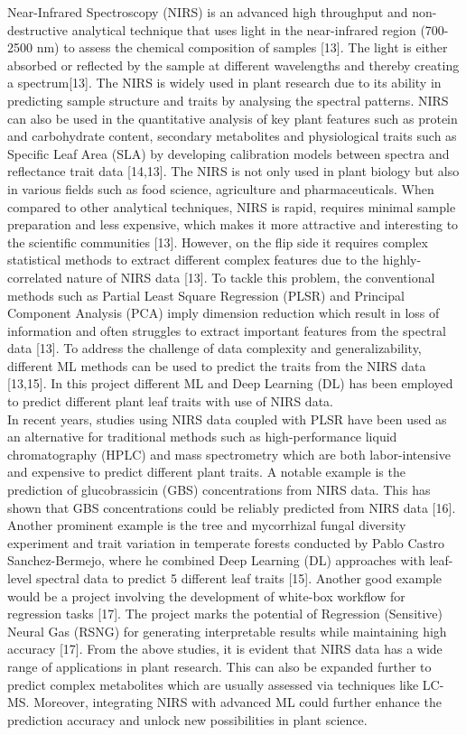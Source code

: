 \documentclass[12pt,a4paper]{article}
\begin{document}
Near-Infrared Spectroscopy (NIRS) is an advanced high throughput and non-destructive analytical technique that uses light in the near-infrared region (700-2500 nm) to assess the chemical composition of samples [13]. The light is either absorbed or reflected by the sample at different wavelengths and thereby creating a spectrum[13]. The NIRS is widely used in plant research due to its ability in predicting sample structure and traits by analysing the spectral patterns.
NIRS can also be used in the quantitative analysis of key plant features such as protein and carbohydrate content, secondary metabolites and physiological traits such as Specific Leaf Area (SLA) by developing calibration models between spectra and reflectance trait data [14,13]. The NIRS is not only used in plant biology but also in various fields such as food science, agriculture and pharmaceuticals. When compared to other analytical techniques, NIRS is rapid, 
requires minimal sample preparation and less expensive, which makes it more attractive and interesting to the scientific communities [13]. However, on the flip side it requires complex statistical methods to extract different complex features due to the highly-correlated nature of NIRS data [13]. To tackle this problem, the conventional methods such as Partial Least Square Regression (PLSR) and Principal Component Analysis (PCA) imply dimension reduction which 
result in loss of information and often struggles to extract important features from the spectral data [13]. To address the challenge of data complexity and generalizability, different ML methods can be used to predict the traits from the NIRS data [13,15]. In this project different ML and Deep Learning (DL) has been employed to predict different plant leaf traits with use of NIRS data. \\


In recent years, studies using NIRS data coupled with PLSR have been used as an alternative for traditional methods such as high-performance liquid chromatography (HPLC) and mass spectrometry which are both labor-intensive and expensive to predict different plant traits. A notable example is the prediction of glucobrassicin (GBS) concentrations from NIRS data. This has shown that GBS 
concentrations could be reliably predicted from NIRS data [16]. Another prominent example is the tree and mycorrhizal fungal diversity experiment and  trait variation in temperate forests  conducted by Pablo Castro Sanchez-Bermejo, where he combined Deep Learning (DL) approaches with leaf-level spectral data to predict 5 different leaf traits [15]. Another good  example would be a 
project involving the development of white-box  workflow for regression tasks [17]. The project marks the potential of Regression (Sensitive) Neural Gas (RSNG) for generating interpretable results while maintaining high accuracy [17]. From the above studies, it is evident that NIRS data has a wide range of applications in plant research. This can also be expanded further to predict 
complex metabolites which are usually assessed via techniques like LC-MS. Moreover, integrating NIRS with advanced ML could further enhance the prediction accuracy and unlock new possibilities in plant science. \\
\end{document}
